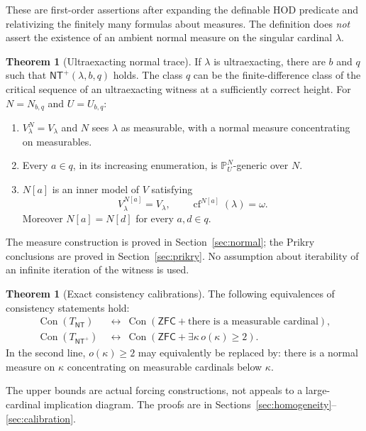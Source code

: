 \documentclass[11pt,letterpaper]{article}
\theoremstyle{definition}
\newtheorem{theorem}[definition]{Theorem}
\numberwithin{equation}{section}
\newcommand{\ZFC}{\mathsf{ZFC}}
\newcommand{\Con}{\operatorname{Con}}
\newcommand{\cf}{\operatorname{cf}}
\newcommand{\PP}{\mathbb P}
\newcommand{\NT}{\mathsf{NT}}
\newcommand{\NTP}{\mathsf{NT}^{+}}
\begin{document}
These are first-order assertions after expanding the definable HOD
predicate and relativizing the finitely many formulas about measures.
The definition does \emph{not} assert the existence of an ambient normal
measure on the singular cardinal $\lambda$.

\begin{theorem}[Ultraexacting normal trace]\label{thm:main}
If $\lambda$ is ultraexacting, there are $b$ and $q$ such that
$\NTP(\lambda,b,q)$ holds. The class $q$ can be the finite-difference
class of the critical sequence of an ultraexacting witness at a
sufficiently correct height. For $N=N_{b,q}$ and $U=U_{b,q}$:
\begin{enumerate}
\item $V_\lambda^N=V_\lambda$ and $N$ sees $\lambda$ as measurable, with
a normal measure concentrating on measurables.
\item Every $a\in q$, in its increasing enumeration, is
$\PP_U^N$-generic over $N$.
\item $N[a]$ is an inner model of $V$ satisfying
\[
  V_\lambda^{N[a]}=V_\lambda,
  \qquad \cf^{N[a]}(\lambda)=\omega.
\]
Moreover $N[a]=N[d]$ for every $a,d\in q$.
\end{enumerate}
\end{theorem}

The measure construction is proved in Section~\ref{sec:normal}; the
Prikry conclusions are proved in Section~\ref{sec:prikry}. No assumption
about iterability of an infinite iteration of the witness is used.

\begin{theorem}[Exact consistency calibrations]\label{thm:calibrations}
The following equivalences of consistency statements hold:
\begin{align}
 \Con(T_{\NT})
  &\ \longleftrightarrow\
    \Con(\ZFC+\text{there is a measurable cardinal}),
       \label{eq:conNT}\\
 \Con(T_{\NTP})
  &\ \longleftrightarrow\
    \Con(\ZFC+\exists\kappa\,o(\kappa)\ge2).
       \label{eq:conNTplus}
\end{align}
In the second line, $o(\kappa)\ge2$ may equivalently be replaced by:
there is a normal measure on $\kappa$ concentrating on measurable
cardinals below $\kappa$.
\end{theorem}

The upper bounds are actual forcing constructions, not appeals to a
large-cardinal implication diagram. The proofs are in
Sections~\ref{sec:homogeneity}--\ref{sec:calibration}.
\end{document}
